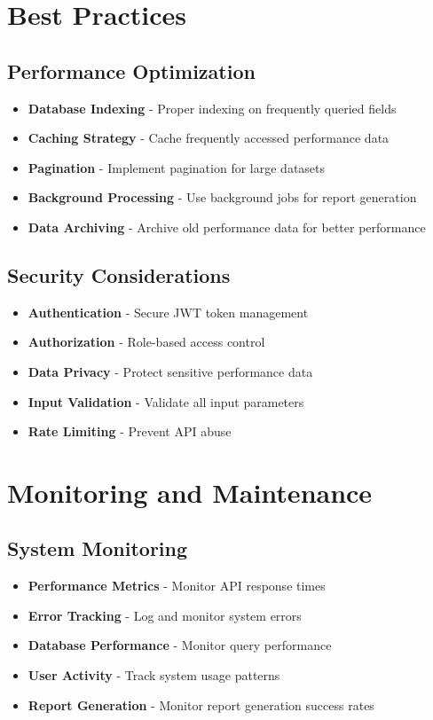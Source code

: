 \documentclass[12pt,a4paper]{article}
\begin{document}
\section{Best Practices}

\subsection{Performance Optimization}
\begin{itemize}
    \item \textbf{Database Indexing} - Proper indexing on frequently queried fields
    \item \textbf{Caching Strategy} - Cache frequently accessed performance data
    \item \textbf{Pagination} - Implement pagination for large datasets
    \item \textbf{Background Processing} - Use background jobs for report generation
    \item \textbf{Data Archiving} - Archive old performance data for better performance
\end{itemize}

\subsection{Security Considerations}
\begin{itemize}
    \item \textbf{Authentication} - Secure JWT token management
    \item \textbf{Authorization} - Role-based access control
    \item \textbf{Data Privacy} - Protect sensitive performance data
    \item \textbf{Input Validation} - Validate all input parameters
    \item \textbf{Rate Limiting} - Prevent API abuse
\end{itemize}

\section{Monitoring and Maintenance}

\subsection{System Monitoring}
\begin{itemize}
    \item \textbf{Performance Metrics} - Monitor API response times
    \item \textbf{Error Tracking} - Log and monitor system errors
    \item \textbf{Database Performance} - Monitor query performance
    \item \textbf{User Activity} - Track system usage patterns
    \item \textbf{Report Generation} - Monitor report generation success rates
\end{itemize}
\end{document}
